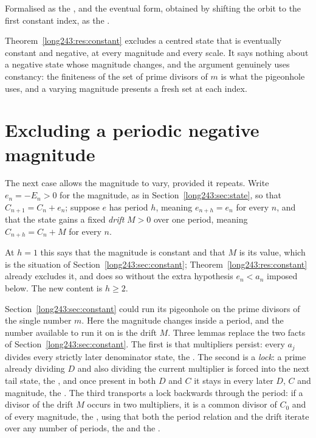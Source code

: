 \noindent Formalised as the
, and the eventual form, obtained by shifting the orbit to the
first constant index, as the
.

Theorem~\ref{long243:res:constant} excludes a centred state that is eventually constant
and negative, at every magnitude and every scale.  It says nothing about a
negative state whose magnitude changes, and the argument genuinely uses
constancy: the finiteness of the set of prime divisors of $m$ is what the
pigeonhole uses, and a varying magnitude presents a fresh set at each index.

\section{Excluding a periodic negative magnitude}\label{long243:sec:periodic}

The next case allows the magnitude to vary, provided it repeats.  Write
$e_n=-E_n>0$ for the magnitude, as in Section~\ref{long243:sec:state}, so that
$C_{n+1}=C_n+e_n$; suppose $e$ has period $h$, meaning $e_{n+h}=e_n$ for every
$n$, and that the state gains a fixed \emph{drift} $M>0$ over one period,
meaning $C_{n+h}=C_n+M$ for every $n$.

At $h=1$ this says that the magnitude is constant and that $M$ is its value,
which is the situation of Section~\ref{long243:sec:constant};
Theorem~\ref{long243:res:constant} already excludes it, and does so without the extra
hypothesis $e_n<a_n$ imposed below.  The new content is $h\ge2$.

Section~\ref{long243:sec:constant} could run its pigeonhole on the prime divisors of
the single number $m$.  Here the magnitude changes inside a period, and the
number available to run it on is the drift $M$.  Three lemmas replace the two
facts of Section~\ref{long243:sec:constant}.  The first is
that multipliers persist: every $a_j$ divides every strictly later denominator
state, the
.  The second is a \emph{lock}: a prime already dividing $D$ and also
dividing the current multiplier is forced into the next tail state, the
, and once present in both $D$ and $C$ it stays in every later $D$, $C$
and magnitude, the
.  The third transports a lock backwards through the period: if a
divisor of the drift $M$ occurs in two multipliers, it is a common divisor of
$C_0$ and of every magnitude, the
, using that both the period relation and the drift iterate over any
number of periods, the
 and the
.

